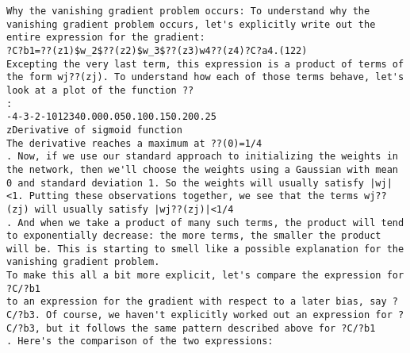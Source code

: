 \begin{lstlisting}
Why the vanishing gradient problem occurs: To understand why the vanishing gradient problem occurs, let's explicitly write out the entire expression for the gradient: 
?C?b1=??(z1)$w_2$??(z2)$w_3$??(z3)w4??(z4)?C?a4.(122)
Excepting the very last term, this expression is a product of terms of the form wj??(zj). To understand how each of those terms behave, let's look at a plot of the function ??
: 
-4-3-2-1012340.000.050.100.150.200.25
zDerivative of sigmoid function
The derivative reaches a maximum at ??(0)=1/4
. Now, if we use our standard approach to initializing the weights in the network, then we'll choose the weights using a Gaussian with mean 0 and standard deviation 1. So the weights will usually satisfy |wj|<1. Putting these observations together, we see that the terms wj??(zj) will usually satisfy |wj??(zj)|<1/4
. And when we take a product of many such terms, the product will tend to exponentially decrease: the more terms, the smaller the product will be. This is starting to smell like a possible explanation for the vanishing gradient problem.
To make this all a bit more explicit, let's compare the expression for ?C/?b1
to an expression for the gradient with respect to a later bias, say ?C/?b3. Of course, we haven't explicitly worked out an expression for ?C/?b3, but it follows the same pattern described above for ?C/?b1
. Here's the comparison of the two expressions: 


\end{lstlisting}
